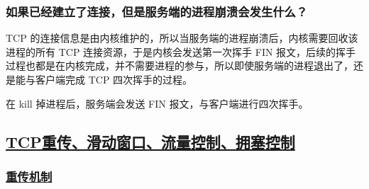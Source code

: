 \documentclass[11pt]{article}
\begin{document}
\subsubsection{如果已经建立了连接，但是服务端的进程崩溃会发生什么？}
\label{sec:orgda74d63}
TCP 的连接信息是由内核维护的，所以当服务端的进程崩溃后，内核需要回收该进程的所有 TCP 连接资源，于是内核会发送第一次挥手 FIN 报文，后续的挥手过程也都是在内核完成，并不需要进程的参与，所以即使服务端的进程退出了，还是能与客户端完成 TCP 四次挥手的过程。

在 kill 掉进程后，服务端会发送 FIN 报文，与客户端进行四次挥手。
\subsection{\underline{TCP重传、滑动窗口、流量控制、拥塞控制}}
\label{sec:orgce57189}

\subsubsection{\underline{重传机制}}
\label{sec:orgaf8a854}
\end{document}
